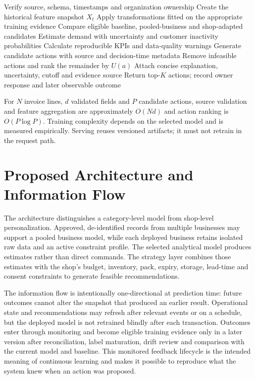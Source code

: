 \begin{algorithm}[H]
\caption{\system{} Strategy Recommendation}
\label{alg:bsmart}
Verify source, schema, timestamps and organization ownership\;
Create the historical feature snapshot $X_t$\;
Apply transformations fitted on the appropriate training evidence\;
Compare eligible baseline, pooled-business and shop-adapted candidates\;
Estimate demand with uncertainty and customer inactivity probabilities\;
Calculate reproducible KPIs and data-quality warnings\;
Generate candidate actions with source and decision-time metadata\;
Remove infeasible actions and rank the remainder by $U(a)$\;
Attach concise explanation, uncertainty, cutoff and evidence source\;
Return top-$K$ actions; record owner response and later observable outcome\;
\end{algorithm}

For $N$ invoice lines, $d$ validated fields and $P$ candidate actions, source
validation and feature aggregation are approximately $O(Nd)$ and action ranking
is $O(P\log P)$. Training complexity depends on the selected model and is
measured empirically. Serving reuses versioned artifacts; it must not retrain in
the request path.

\section{Proposed Architecture and Information Flow}



The architecture distinguishes a category-level model from shop-level
personalization. Approved, de-identified records from multiple businesses may
support a pooled business model, while each deployed business retains isolated
raw data and an active constraint profile. The selected analytical model
produces estimates rather than direct commands. The strategy layer combines
those estimates with the shop's budget, inventory, pack, expiry, storage,
lead-time and consent constraints to generate feasible recommendations.

The information flow is intentionally one-directional at prediction time:
future outcomes cannot alter the snapshot that produced an earlier result.
Operational state and recommendations may refresh after relevant events or on a
schedule, but the deployed model is not retrained blindly after each
transaction. Outcomes enter through monitoring and become eligible training
evidence only in a later version after reconciliation, label maturation, drift
review and comparison with the current model and baseline. This monitored
feedback lifecycle is the intended meaning of continuous learning and makes it
possible to reproduce what the system knew when an action was proposed.

